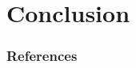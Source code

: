 \documentclass[10pt]{beamer}
\begin{document}
\section{Conclusion}
\begin{frame}[fragile]
\end{frame}


\begin{frame}[allowframebreaks]

  \frametitle{References}

  
  

\end{frame}
\end{document}
